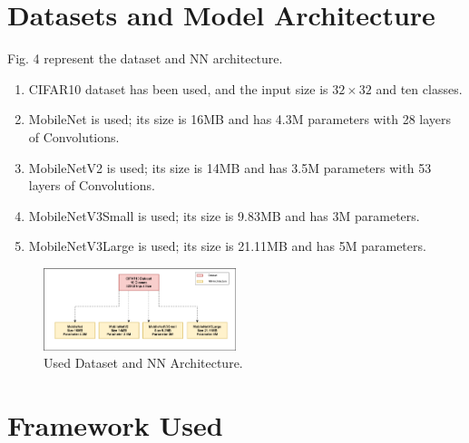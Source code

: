 \documentclass[conference]{IEEEtran}
\begin{document}
\section{Datasets and Model Architecture}
Fig. 4 represent the dataset and NN architecture.
\begin{enumerate}
    \item CIFAR10 dataset has been used, and the input size is $32\times32$ and ten classes.
    \item MobileNet \cite{howard2017mobilenets} is used; its size is 16MB and has 4.3M parameters with 28 layers of Convolutions. 
    \item MobileNetV2 \cite{sandler2018mobilenetv2} is used; its size is 14MB and has 3.5M parameters with 53 layers of Convolutions.
    \item MobileNetV3Small \cite{howard2019searching} is used; its size is 9.83MB and has 3M parameters.
    \item MobileNetV3Large \cite{howard2019searching} is used; its size is 21.11MB and has 5M parameters.
\end{enumerate}

\begin{figure}[htp]
        \centering
        \includegraphics[width=0.5\textwidth]{Images/Dataset_and_architecture.png}
        \caption{Used Dataset and NN Architecture.}
    \end{figure}
    
\section{Framework Used}
\end{document}
